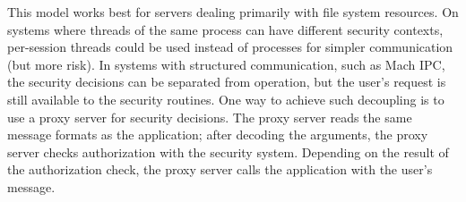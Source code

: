 This model works
best for servers dealing primarily with file system resources. On systems where threads of the
same process can have different security contexts, per-session threads could be used instead
of processes for simpler communication (but more risk). In systems with structured
communication, such as Mach IPC, the security decisions can be separated from operation,
but the user's request is still available to the security routines. One way to achieve
such decoupling is to use a proxy server for security decisions. The proxy server reads
the same message formats as the application; after decoding the arguments, the proxy
server checks authorization with the security system. Depending on the result of the
authorization check, the proxy server calls the application with the user's message.
